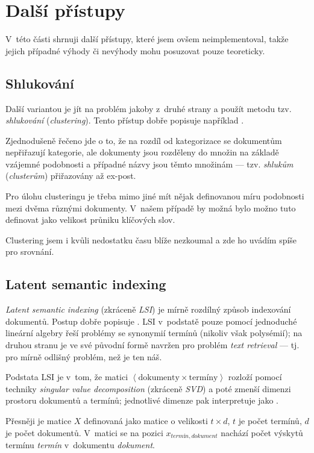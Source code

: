 \documentclass[12pt,a4paper]{report}
\begin{document}
\section{Další přístupy}
V~této části shrnuji další přístupy, které jsem ovšem neimplementoval, takže jejich případné výhody či nevýhody mohu posuzovat pouze teoreticky.

\subsection{Shlukování}
Další variantou je jít na problém jakoby z~druhé strany a použít metodu tzv. \emph{shlukování} (\emph{clustering}). Tento přístup dobře popisuje například \cite{clustering}.

Zjednodušeně řečeno jde o to, že na rozdíl od kategorizace se dokumentům nepřiřazují kategorie, ale dokumenty jsou rozděleny do množin na základě vzájemné podobnosti a případné názvy jsou těmto množinám --- tzv. \emph{shlukům} (\emph{clusterům}) přiřazovány až ex-post. 

Pro úlohu clusteringu je třeba mimo jiné mít nějak definovanou míru podobnosti mezi dvěma různými dokumenty. V~našem případě by možná bylo možno tuto  de\-fi\-no\-vat ja\-ko ve\-li\-kost prů\-ni\-ku klíčových slov.

Clustering jsem i kvůli nedostatku času blíže nezkoumal a zde ho uvádím spíše pro srovnání.

\subsection{Latent semantic indexing}
\emph{Latent semantic indexing} (zkráceně \emph{LSI}) je mírně rozdílný způsob indexování dokumentů. Postup dobře popisuje \cite{lsi}. LSI v~podstatě pouze pomocí jednoduché lineární algebry řeší problémy se synonymií termínů (nikoliv však polysémií); na druhou stranu je ve své původní formě navržen pro problém \emph{text retrieval} --- tj. pro mírně odlišný problém, než je ten náš.

Podstata LSI je v~tom, že matici $\left< \mathrm{dokumenty} \times \mathrm{termíny}\right>$ rozloží pomocí techniky \emph{singular value decomposition} (zkráceně \emph{SVD}) a poté zmenší dimenzi prostoru dokumentů a termínů; jednotlivé dimenze pak \cite{lsi} interpretuje jako .

Přesněji je matice $X$ definovaná jako matice o velikosti $t\times d$, $t$ je počet termínů, $d$ je počet dokumentů. V~matici se na pozici $x_{termín, dokument}$ nachází počet výskytů termínu \emph{termín} v~dokumentu \emph{dokument}. 
\end{document}

